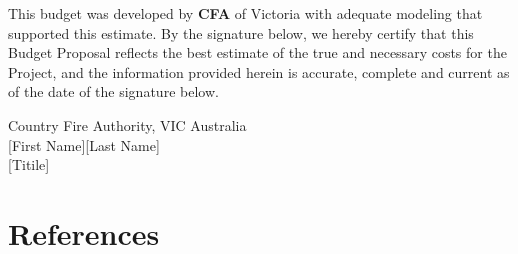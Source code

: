 \documentclass[13pt]{ctexart} %
\begin{document}
\begin{flushleft}
    \fontsize{12pt}{10pt} %
    \selectfont
    \indent This budget was developed by \textbf{CFA} of Victoria with adequate modeling that supported this estimate. By the signature below,  we hereby certify that this Budget Proposal reflects the best estimate of the true and necessary costs for the Project, and the information provided herein is accurate, complete and current as of the date of the signature below.
\end{flushleft}

\thispagestyle{empty}
\vspace{10pt}
\begin{flushleft}
    Country Fire Authority, VIC Australia\\
    {[First Name][Last Name]}\\
    {[Titile]}
\end{flushleft}

\newpage
\section*{References}
\fancyhf{}
\fancyhead[R]{ }
\fancyhead[L]{ }

\Large

\end{document}

